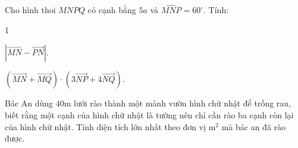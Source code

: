 \TL
\begin{ex}
Cho hình thoi $MNPQ$ có cạnh bằng $5a$ và $\widehat{MNP}=60^\circ$. Tính:
\begin{enumEX}[a)]{1}
\item $|\overrightarrow{MN}-\overrightarrow{PN}|$.
\item $(\overrightarrow{MN}+\overrightarrow{MQ})\cdot(3 \overrightarrow{NP}+4\overrightarrow{NQ})$.
\end{enumEX}
\end{ex}
\begin{ex}%
	Bác An dùng $40$m lưới rào thành một mảnh vườn hình chữ nhật để trồng rau, biết rằng một cạnh của hình chữ nhật là tường nên chỉ cần rào ba cạnh còn lại của hình chữ nhật. Tính diện tích lớn nhất theo đơn vị m$^2$ mà bác an đã rào được.
\end{ex}

